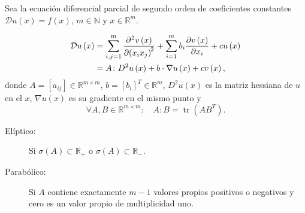 \begin{definition}[Clasificación]
    Sea la ecuación diferencial parcial de segundo orden de
    coeficientes constantes
    \begin{math}
        \mathcal{D}u\left(x\right)=
        f\left(x\right)
    \end{math},
    \begin{math}
        m\in\mathbb{N}
    \end{math}
    y
    \begin{math}
        x\in\mathbb{R}^{m}
    \end{math}.

    \begin{align*}
        \mathcal{D}
        u\left(x\right) & =
        \sum_{i,j=1}^{m}
        \diffp[2]{v\left(x\right)}{x_{i}x_{j}}+
        \sum_{i=1}^{m}
        b_{i}
        \diffp{v\left(x\right)}{x_{i}}+
        cu\left(x\right)    \\
                        & =
        A\colon D^{2}u\left(x\right)+
        b\cdot\nabla u\left(x\right)+
        cv\left(x\right),
    \end{align*}
    donde $A=\left[a_{ij}\right]\in\mathbb{R}^{m\times m}$,
    \begin{math}
        b={\left[b_{i}\right]}^{T}\in\mathbb{R}^{m}
    \end{math},
    \begin{math}
        D^{2}u\left(x\right)
    \end{math}
    es la matriz hessiana de $u$ en el $x$,
    \begin{math}
        \nabla u\left(x\right)
    \end{math}
    es su gradiente en el mismo punto
    y
    \begin{equation*}
        \forall A,B\in\mathbb{R}^{m\times m}:\quad
        A\colon B=\operatorname{tr}\left(AB^{T}\right).
    \end{equation*}

    \begin{description}
        \item[Elíptico:]

            Si $\sigma\left(A\right)\subset\mathbb{R}_{+}$ o
            $\sigma\left(A\right)\subset\mathbb{R}_{-}$.

        \item[Parabólico:]

            Si $A$ contiene exactamente $m-1$ valores propios
            positivos o negativos y cero es un valor propio de
            multiplicidad uno.


\end{description}
\end{definition}
